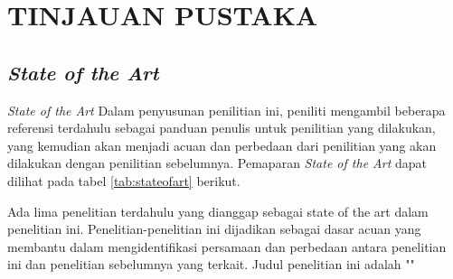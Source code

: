 \chapter{TINJAUAN PUSTAKA}

\section{\textit{State of the Art}}
\noindent

\textit{State of the Art} Dalam penyusunan penilitian ini, peniliti mengambil beberapa referensi terdahulu sebagai panduan penulis untuk penilitian yang dilakukan, yang kemudian  akan menjadi acuan dan perbedaan dari penilitian yang akan dilakukan dengan penilitian sebelumnya. Pemaparan \textit{State of the Art} dapat dilihat pada tabel \ref{tab:stateofart} berikut.

Ada lima penelitian terdahulu yang dianggap sebagai state of the art dalam penelitian ini. Penelitian-penelitian ini dijadikan sebagai dasar acuan yang membantu dalam mengidentifikasi persamaan dan perbedaan antara penelitian ini dan penelitian sebelumnya yang terkait. Judul penelitian ini adalah "\judulId"

